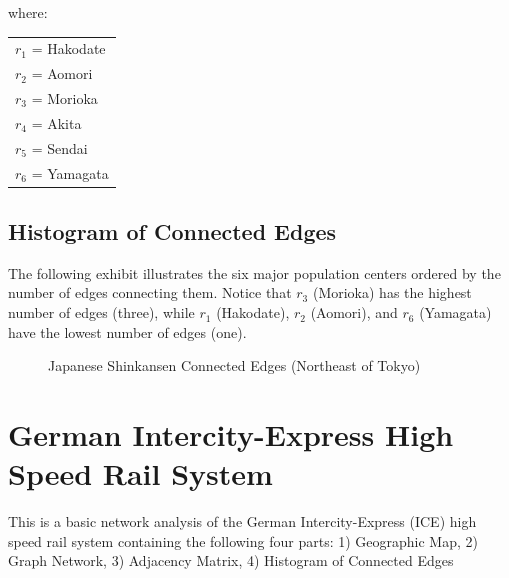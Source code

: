 \documentclass{article}
\begin{document}
    where:
    \begin{center}
    \begin{tabular}{l}
        $r_1$ = Hakodate\\
        $r_2$ = Aomori\\
        $r_3$ = Morioka\\
        $r_4$ = Akita\\
        $r_5$ = Sendai\\
        $r_6$ = Yamagata\\
    \end{tabular}
    \end{center}

\newpage
\subsection*{Histogram of Connected Edges}
The following exhibit illustrates the six major population centers ordered by the number of edges connecting them. Notice that $r_3$ (Morioka) has the highest number of edges (three), while $r_1$ (Hakodate), $r_2$ (Aomori), and $r_6$ (Yamagata) have the lowest number of edges (one).

    \begin{figure}[h]
    \centering
    \caption{Japanese Shinkansen Connected Edges (Northeast of Tokyo)}
    \label{fig:plotjp}
    \end{figure}

\newpage
\section*{German Intercity-Express High Speed Rail System}
This is a basic network analysis of the German Intercity-Express (ICE) high speed rail system containing the following four parts: 1) Geographic Map, 2) Graph Network, 3) Adjacency Matrix, 4) Histogram of Connected Edges
\end{document}
